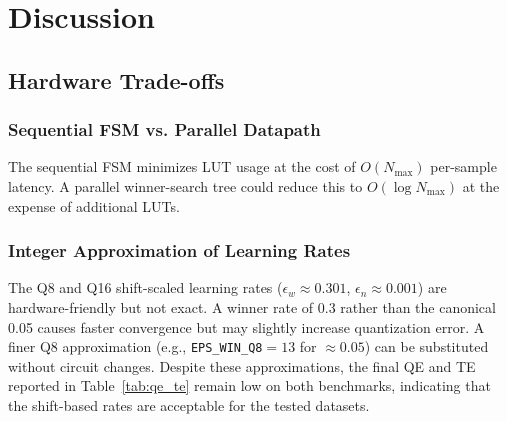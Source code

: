 \documentclass[conference]{IEEEtran}
\begin{document}
\begin{table}[!h]
\centering
\caption{FPGA runtime performance
 at 27~MHz ($N_{\max}=40$).}
\label{tab:runtime}
\footnotesize
\setlength{\tabcolsep}{3pt}
\end{table}

\section{Discussion}

\subsection{Hardware Trade-offs}

\subsubsection{Sequential FSM vs. Parallel Datapath}
The sequential FSM minimizes LUT usage at the cost of $O(N_{\max})$ per-sample latency. A parallel winner-search tree could reduce this to $O(\log N_{\max})$ at the expense of additional LUTs.

\subsubsection{Integer Approximation of Learning Rates}
The Q8 and Q16 shift-scaled learning rates ($\epsilon_w \approx 0.301$, $\epsilon_n \approx 0.001$) are hardware-friendly but not exact. A winner rate of 0.3 rather than the canonical 0.05 causes faster convergence but may slightly increase quantization error. A finer Q8 approximation (e.g., \texttt{EPS\_WIN\_Q8}$=13$ for $\approx 0.05$) can be substituted without circuit changes. Despite these approximations, the final QE and TE reported in Table~\ref{tab:qe_te} remain low on both benchmarks, indicating that the shift-based rates are acceptable for the tested datasets.
\end{document}
